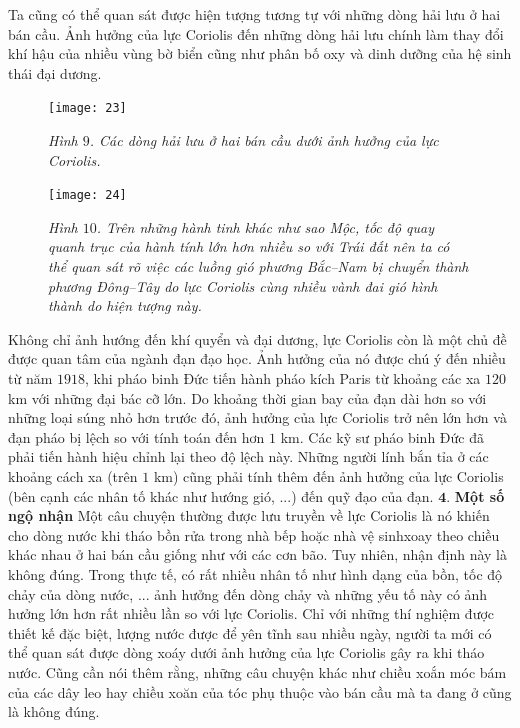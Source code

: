 \begin{multicols}{2}
\begin{figure}[H]
		\vspace*{-10pt}
	\end{figure}
	Ta cũng có thể quan sát được hiện tượng tương tự với những dòng hải lưu ở hai bán cầu. Ảnh hưởng của lực Coriolis đến những dòng hải lưu chính làm thay đổi khí hậu của nhiều vùng bờ biển cũng như phân bố oxy và dinh dưỡng của hệ sinh thái đại dương.
	\begin{figure}[H]
		\vspace*{-5pt}
		\centering
		\captionsetup{labelformat= empty, justification=centering}
		\texttt{[image: 23]}
		\caption{\small\textit{\color{timhieukhoahoc}Hình $9$. Các dòng hải lưu ở hai bán cầu dưới ảnh hưởng của lực Coriolis.}}
		\vspace*{-10pt}
	\end{figure}
		\begin{figure}[H]
		\vspace*{-5pt}
		\centering
		\captionsetup{labelformat= empty, justification=centering}
		\texttt{[image: 24]}
		\caption{\small\textit{\color{timhieukhoahoc}Hình $10$. Trên những hành tinh khác như sao Mộc, tốc độ quay quanh trục của hành tính lớn hơn nhiều so với Trái đất nên ta có thể quan sát rõ việc các luồng gió phương Bắc--Nam bị chuyển thành phương Đông--Tây do lực Coriolis cùng nhiều vành đai gió hình thành do hiện tượng này.}}
		\vspace*{-10pt}
	\end{figure}
	Không chỉ ảnh hướng đến khí quyển và đại dương, lực Coriolis còn là một chủ đề được quan tâm của ngành đạn đạo học. Ảnh hưởng của nó được chú ý đến nhiều từ năm $1918$, khi pháo binh Đức tiến hành pháo kích Paris từ khoảng các xa $120$ km với những đại bác cỡ lớn. Do khoảng thời gian bay của đạn dài hơn so với những loại súng nhỏ hơn trước đó, ảnh hưởng của lực Coriolis trở nên lớn hơn và đạn pháo bị lệch so với tính toán đến hơn $1$ km. Các kỹ sư pháo binh Đức đã phải tiến hành hiệu chỉnh lại theo độ lệch này. Những người lính bắn tỉa ở các khoảng cách xa (trên $1$ km) cũng phải tính thêm đến ảnh hưởng của lực Coriolis (bên cạnh các nhân tố khác như hướng gió, ...) đến quỹ đạo của đạn.
	\vskip 0.1cm
	$\pmb{4.}$ \textbf{Một số ngộ nhận}
	\vskip 0.1cm
	Một câu chuyện thường được lưu truyền về lực Coriolis là nó khiến cho dòng nước khi tháo bồn rửa trong nhà bếp hoặc nhà vệ sinh\linebreak xoay theo chiều khác nhau ở hai bán cầu giống như với các cơn bão. Tuy nhiên, nhận định này là không đúng. Trong thực tế, có rất nhiều nhân tố như hình dạng của bồn, tốc độ chảy của dòng nước, ... ảnh hưởng đến dòng chảy và những yếu tố này có ảnh hưởng lớn hơn rất nhiều lần so với lực Coriolis. Chỉ với những thí nghiệm được thiết kế đặc biệt, lượng nước được để yên tĩnh sau nhiều ngày, người ta mới có thể quan sát được dòng xoáy dưới ảnh hưởng của lực Coriolis gây ra khi tháo nước. Cũng cần nói thêm rằng, những câu chuyện khác như chiều xoắn móc bám của các dây leo hay chiều xoăn của tóc phụ thuộc vào bán cầu mà ta đang ở cũng là không đúng.

\end{multicols}
